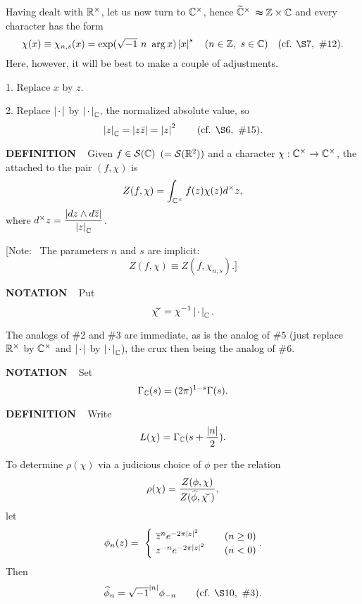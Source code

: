 \vspace{0.1cm}

Having dealt with $\mathbb{R}^\times$, let us now turn to $\mathbb{C}^\times$, hence 
$\widetilde{\mathbb{C}}^\times$ $\thickapprox \mathbb{Z} \times \mathbb{C}$ and every character has the form
\[
\chi(x) \equiv \chi_{n,s}(x) = \exp(\sqrt{-1} \  n \  \arg x) \abs{x}^s 
\quad (n \in \Z, \ s \in \C) \quad (\text{cf. } \S 7, \ \#12).
\]
Here, however, it will be best to make a couple of adjustments.

1. Replace $x$ by $z$.

2. Replace $\left\vert\hspace{0.05cm} \cdot \hspace{0.05cm}\right\vert$ by $\left\vert\hspace{0.05cm} \cdot \hspace{0.05cm}\right\vert_{\mathbb{C}}$, the normalized absolute value, so
\[
\abs{z}_\C = \abs{z  \bar{z}} = \abs{z}^2	\qquad ( \text{cf. } \S6, \  \#15).
\]

\begin{x}{\small\bf DEFINITION} \ %
Given $f \in \mathcal{S}(\mathbb{C})$ $(= \mathcal{S}(\mathbb{R}^2))$ and a character $\chi : \mathbb{C}^\times \rightarrow \mathbb{C}^\times$, the  attached to the pair $(f, \chi)$ is
\[
Z(f,\chi) = \int_{\mathbb{C}^\times} f(z) \chi(z) d^\times z,
\]
where $d^\times z = \displaystyle\frac{\left\vert dz \wedge d\overline{z}\right\vert}{\left\vert z\right\vert_{\mathbb{C}} }$.
\vspace{0.2cm}

[Note: \  The parameters $n$ and $s$ are implicit:
\[
Z(f,\chi) \equiv Z(f, \chi_{n,s}).]
\]
\end{x}

\vspace{0.1cm}


\begin{x}{\small\bf NOTATION} \ %
Put
\[
\widecheck{\chi} = \chi^{-1} \acdot_\C.
\]

The analogs of \#2 and \#3 are immediate, as is the analog of $\#5$ 
(just replace $\mathbb{R}^\times$ by $\mathbb{C}^\times$ and $\left\vert\hspace{0.05cm} \cdot \hspace{0.05cm}\right\vert$ by $\left\vert\hspace{0.05cm} \cdot \hspace{0.05cm}\right\vert_{\mathbb{C}}$), the crux then being the analog of $\#6$.
\end{x}

\vspace{0.1cm}



\begin{x}{\small\bf NOTATION} \ %
Set
\[
\Gamma_{\mathbb{C}}(s) = (2\pi)^{1-s} \Gamma(s).
\]
\end{x}

\vspace{0.1cm}


\begin{x}{\small\bf DEFINITION} \ %
Write
\[
L(\chi) = \Gamma_{\mathbb{C}}(s + \frac{\left\vert n\right\vert}{2}).
\]

To determine $\rho(\chi)$ via a judicious choice of $\phi$ per the relation
\[
\rho(\chi) = \frac{Z(\phi,\chi)}{Z(\widehat{\phi},\widecheck{\chi})},
\]
let
\[
\phi_n(z) =\ 
\begin{cases}
\ \ov{z}^{n} e^{-2\pi\abs{z}^2}		&\quad (n \ge 0)\\
\ z^{-n} e^{-2\pi\abs{z}^2}	 		&\quad (n < 0)\\
\end{cases}
.\]
Then
\[
\widehat{\phi}_n = \sqrt{-1}^{\abs{n}} \phi_{-n} 	\qquad (\text{cf. } \S 10, \  \#3).
\]
\end{x}

